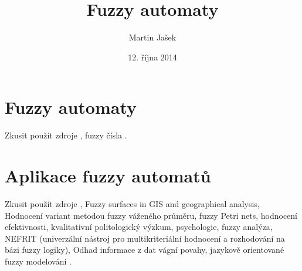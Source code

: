 \documentclass[a4paper,10pt]{article}
\title{Fuzzy automaty}
\author{Martin Jašek}
\date{12. října 2014}
\begin{document}
\maketitle
\tableofcontents

\newpage

\section{Fuzzy automaty}
\TODO

Zkusit použít zdroje
\cite{fuzz-aut-and-langs}
\cite{fuzz-db-model-xml}
\cite{fuzz-grammar}
\cite{fuzz-rel-syss}
\cite{incompl-info-rough-set-anal},
fuzzy čísla
.



\section{Aplikace fuzzy automatů}
\TODO

Zkusit použít zdroje
\cite{fuzz-log-in-eng}
\cite{fuzz-met-rozh}
\cite{fuzz-tech-in-img-proc}
\cite{incompl-info-rough-set-anal},
Fuzzy surfaces in GIS and geographical analysis,
Hodnocení variant metodou fuzzy váženého průměru,
fuzzy Petri nets,
hodnocení efektivnosti,
kvalitativní politologický výzkum,
psychologie,
fuzzy analýza,
NEFRIT (univerzální nástroj pro multikriteriální hodnocení a rozhodování na bázi fuzzy logiky),
Odhad informace z dat vágní povahy,
jazykově orientované fuzzy modelování
.

\newpage


\end{document}
